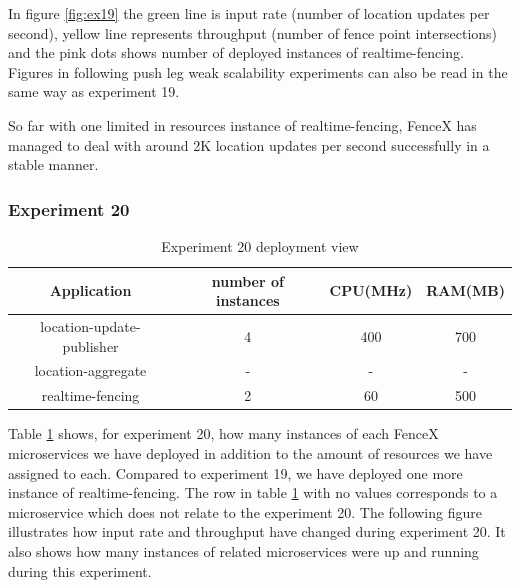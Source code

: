 \documentclass[a4]{report}
\begin{document}
    \clearpage

    In figure \ref{fig:ex19} the green line is input rate (number of location updates per second),
    yellow line represents throughput (number of fence point intersections) and the pink dots shows number of
    deployed instances of realtime-fencing.
    Figures in following push leg weak scalability experiments can also be read in the same way as experiment 19.

    So far with one limited in resources instance of realtime-fencing, FenceX has managed to deal with around 2K
    location updates per second successfully in a stable manner.

    \subsubsection{Experiment 20}
    \begin{table}[h!]
        \centering
        \begin{tabular}{|c|c|c|c|}
            \hline
            Application               & number of instances & CPU(MHz) & RAM(MB) \\
            \hline
            location-update-publisher & 4                   & 400      & 700     \\
            location-aggregate        & -                   & -        & -       \\
            realtime-fencing          & 2                   & 60       & 500     \\
            \hline
        \end{tabular}
        \caption{Experiment 20 deployment view}
        \label{table:ex20-dv}
    \end{table}

    Table \ref{table:ex20-dv} shows, for experiment 20, how many instances of each FenceX microservices we have
    deployed in addition to the amount of resources we have assigned to each.
    Compared to experiment 19, we have deployed one more instance of realtime-fencing.
    The row in table \ref{table:ex20-dv} with no values corresponds to a microservice which does not relate to the
    experiment 20.
    The following figure illustrates how input rate and throughput have changed during experiment 20.
    It also shows how many instances of related microservices were up and running during this experiment.
\end{document}
